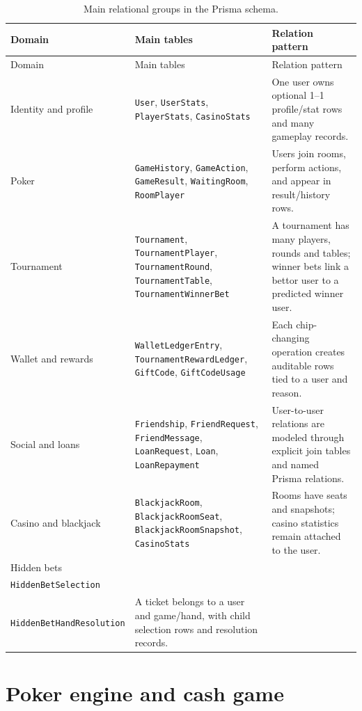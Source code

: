 \documentclass[11pt,a4paper]{article}
\begin{document}
\begin{longtable}{@{}p{3.1cm}p{5.35cm}p{5.95cm}@{}}
\caption{Main relational groups in the Prisma schema.}\label{tab:db-relational-groups}\\
\toprule
Domain & Main tables & Relation pattern \\
\midrule
\endfirsthead
\toprule
Domain & Main tables & Relation pattern \\
\midrule
\endhead
Identity and profile & \texttt{User}, \texttt{UserStats}, \texttt{PlayerStats}, \texttt{CasinoStats} & One user owns optional 1--1 profile/stat rows and many gameplay records. \\
Poker & \texttt{GameHistory}, \texttt{GameAction}, \texttt{GameResult}, \texttt{WaitingRoom}, \texttt{RoomPlayer} & Users join rooms, perform actions, and appear in result/history rows. \\
Tournament & \texttt{Tournament}, \texttt{TournamentPlayer}, \texttt{TournamentRound}, \texttt{TournamentTable}, \texttt{TournamentWinnerBet} & A tournament has many players, rounds and tables; winner bets link a bettor user to a predicted winner user. \\
Wallet and rewards & \texttt{WalletLedgerEntry}, \texttt{TournamentRewardLedger}, \texttt{GiftCode}, \texttt{GiftCodeUsage} & Each chip-changing operation creates auditable rows tied to a user and reason. \\
Social and loans & \texttt{Friendship}, \texttt{FriendRequest}, \texttt{FriendMessage}, \texttt{LoanRequest}, \texttt{Loan}, \texttt{LoanRepayment} & User-to-user relations are modeled through explicit join tables and named Prisma relations. \\
Casino and blackjack & \texttt{BlackjackRoom}, \texttt{BlackjackRoomSeat}, \texttt{BlackjackRoomSnapshot}, \texttt{CasinoStats} & Rooms have seats and snapshots; casino statistics remain attached to the user. \\
Hidden bets & \shortstack[l]{\texttt{HiddenBetTicket}\\\texttt{HiddenBetSelection}\\\texttt{HiddenBetHandResolution}} & A ticket belongs to a user and game/hand, with child selection rows and resolution records. \\
\bottomrule
\end{longtable}

\section{Poker engine and cash game}
\label{app:poker}
\end{document}
